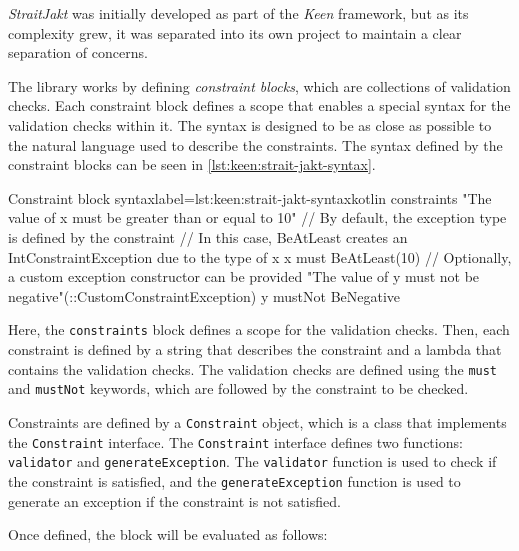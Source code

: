         \textit{StraitJakt} was initially developed as part of the \textit{Keen} framework, but as its complexity grew,
        it was separated into its own project to maintain a clear separation of concerns.

        The library works by defining \textit{constraint blocks}, which are collections of validation checks. Each
        constraint block defines a scope that enables a special syntax for the validation checks within it. The syntax
        is designed to be as close as possible to the natural language used to describe the constraints. The syntax
        defined by the constraint blocks can be seen in \vref{lst:keen:strait-jakt-syntax}.

        \begin{code}{Constraint block syntax}{label={lst:keen:strait-jakt-syntax}}{kotlin}
            constraints {
                "The value of x must be greater than or equal to 10" {
                    // By default, the exception type is defined by the constraint
                    // In this case, BeAtLeast creates an IntConstraintException due to the type of x
                    x must BeAtLeast(10)
                }
                // Optionally, a custom exception constructor can be provided
                "The value of y must not be negative"(::CustomConstraintException) {
                    y mustNot BeNegative
                }
            }
        \end{code}

        Here, the \texttt{constraints} block defines a scope for the validation checks. Then, each constraint is defined
        by a string that describes the constraint and a lambda that contains the validation checks. The validation
        checks are defined using the \texttt{must} and \texttt{mustNot} keywords, which are followed by the constraint
        to be checked.
        
        Constraints are defined by a \texttt{Constraint} object, which is a class that implements the 
        \texttt{Constraint} interface. The \texttt{Constraint} interface defines two functions: \texttt{validator} and
        \texttt{generateException}. The \texttt{validator} function is used to check if the constraint is satisfied,
        and the \texttt{generateException} function is used to generate an exception if the constraint is not
        satisfied.

        Once defined, the block will be evaluated as follows:

